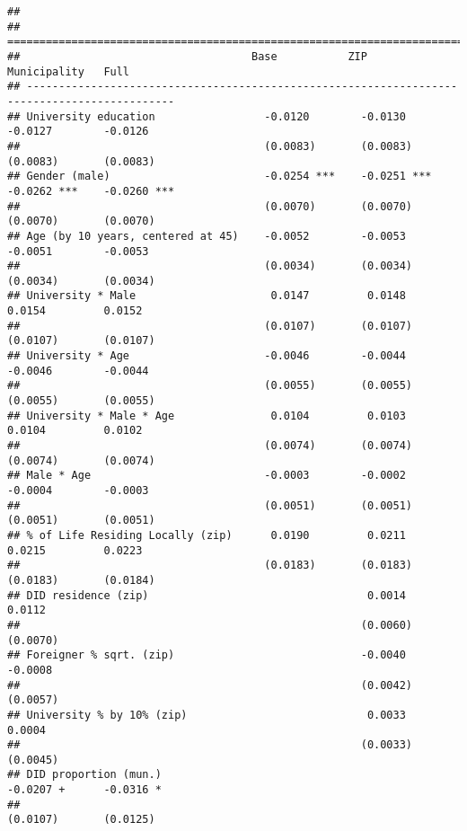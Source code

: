 \documentclass[
]{article}
\begin{document}
\begin{verbatim}
## 
## =============================================================================================
##                                    Base           ZIP            Municipality   Full         
## ---------------------------------------------------------------------------------------------
## University education                 -0.0120        -0.0130        -0.0127        -0.0126    
##                                      (0.0083)       (0.0083)       (0.0083)       (0.0083)   
## Gender (male)                        -0.0254 ***    -0.0251 ***    -0.0262 ***    -0.0260 ***
##                                      (0.0070)       (0.0070)       (0.0070)       (0.0070)   
## Age (by 10 years, centered at 45)    -0.0052        -0.0053        -0.0051        -0.0053    
##                                      (0.0034)       (0.0034)       (0.0034)       (0.0034)   
## University * Male                     0.0147         0.0148         0.0154         0.0152    
##                                      (0.0107)       (0.0107)       (0.0107)       (0.0107)   
## University * Age                     -0.0046        -0.0044        -0.0046        -0.0044    
##                                      (0.0055)       (0.0055)       (0.0055)       (0.0055)   
## University * Male * Age               0.0104         0.0103         0.0104         0.0102    
##                                      (0.0074)       (0.0074)       (0.0074)       (0.0074)   
## Male * Age                           -0.0003        -0.0002        -0.0004        -0.0003    
##                                      (0.0051)       (0.0051)       (0.0051)       (0.0051)   
## % of Life Residing Locally (zip)      0.0190         0.0211         0.0215         0.0223    
##                                      (0.0183)       (0.0183)       (0.0183)       (0.0184)   
## DID residence (zip)                                  0.0014                        0.0112    
##                                                     (0.0060)                      (0.0070)   
## Foreigner % sqrt. (zip)                             -0.0040                       -0.0008    
##                                                     (0.0042)                      (0.0057)   
## University % by 10% (zip)                            0.0033                        0.0004    
##                                                     (0.0033)                      (0.0045)   
## DID proportion (mun.)                                              -0.0207 +      -0.0316 *  
##                                                                    (0.0107)       (0.0125)   

\end{verbatim}
\end{document}
